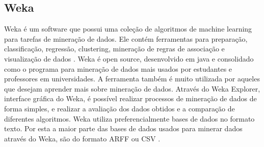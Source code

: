 \subsection{Weka}
Weka é um software que possui uma coleção de algoritmos de machine learning para tarefas de mineração de dados. Ele contém ferramentas para preparação, classificação, regressão, clustering, mineração de regras de associação e visualização de dados \cite{Weka}.
Weka é open source, desenvolvido em java e consolidado como o programa para mineração de dados mais usados por estudantes e professores em universidades. A ferramenta também é muito utilizada por aqueles que desejam aprender mais sobre mineração de dados. Através do Weka Explorer, interface gráfica do Weka, é possível realizar processos de mineração de dados de forma simples, e realizar a avaliação dos dados obtidos e a comparação de diferentes algoritmos. 
Weka utiliza preferencialmente bases de dados no formato texto. Por esta a maior parte das bases de dados usados para minerar dados através do Weka, são do formato ARFF ou CSV \cite{Goncalves2012}.